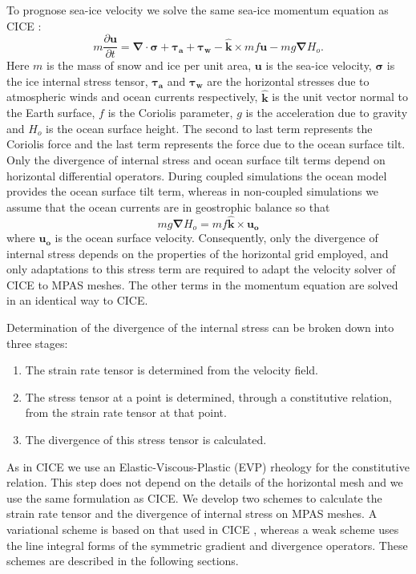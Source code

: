 To prognose sea-ice velocity we solve the same sea-ice momentum equation as CICE \citep{Hibler79,Hunke97}:
\begin{equation}
m \frac{\partial{\boldsymbol{u}}}{\partial{t}} = \boldsymbol{\nabla} \cdot \boldsymbol{\sigma} + \boldsymbol{\tau_a} + \boldsymbol{\tau_w} - \boldsymbol{\hat{k}} \times m f \boldsymbol{u} -mg \boldsymbol{\nabla}H_o.
\end{equation}
Here $m$ is the mass of snow and ice per unit area, $\boldsymbol{u}$ is the sea-ice velocity, $\boldsymbol{\sigma}$ is the ice internal stress tensor, $\boldsymbol{\tau_a}$ and $\boldsymbol{\tau_w}$ are the horizontal stresses due to atmospheric winds and ocean currents respectively, $\boldsymbol{\hat{k}}$ is the unit vector normal to the Earth surface, $f$ is the Coriolis parameter, $g$ is the acceleration due to gravity and $H_o$ is the ocean surface height. The second to last term represents the Coriolis force and the last term represents the force due to the ocean surface tilt. Only the divergence of internal stress and ocean surface tilt terms depend on horizontal differential operators. During coupled simulations the ocean model provides the ocean surface tilt term, whereas in non-coupled simulations we assume that the ocean currents are in geostrophic balance so that
\begin{equation}
mg \boldsymbol{\nabla}H_o = m f \boldsymbol{\hat{k}} \times \boldsymbol{u_o}
\end{equation}
where $\boldsymbol{u_o}$ is the ocean surface velocity. Consequently, only the divergence of internal stress depends on the properties of the horizontal grid employed, and only adaptations to this stress term are required to adapt the velocity solver of CICE to MPAS meshes. The other terms in the momentum equation are solved in an identical way to CICE.

Determination of the divergence of the internal stress can be broken down into three stages: 
\begin{enumerate}
\item The strain rate tensor is determined from the velocity field.
\item The stress tensor at a point is determined, through a constitutive relation, from the strain rate tensor at that point.
\item The divergence of this stress tensor is calculated. 
\end{enumerate}
As in CICE we use an Elastic-Viscous-Plastic (EVP) rheology \citep{Hunke97} for the constitutive relation. This step does not depend on the details of the horizontal mesh and we use the same formulation as CICE. We develop two schemes to calculate the strain rate tensor and the divergence of internal stress on MPAS meshes. A variational scheme is based on that used in CICE \citep{Hunke02}, whereas a weak scheme uses the line integral forms of the symmetric gradient and divergence operators. These schemes are described in the following sections.


